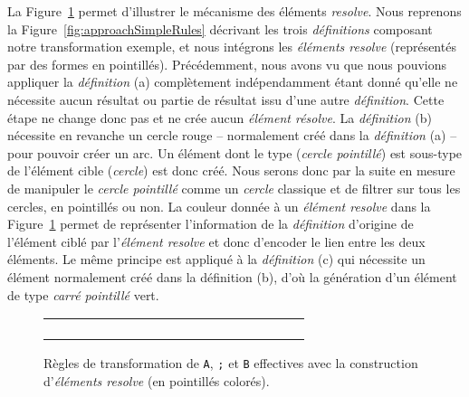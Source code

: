 
La Figure~\ref{fig:approachSimpleRulesResolve} permet d'illustrer le mécanisme
des éléments \emph{resolve}. Nous reprenons la
Figure~\ref{fig:approachSimpleRules} décrivant les trois \emph{définitions}
composant notre transformation exemple, et nous intégrons les \emph{éléments
resolve} (représentés par des formes en pointillés). Précédemment, nous avons
vu que nous pouvions appliquer la \emph{définition} (a) complètement
indépendamment étant donné qu'elle ne nécessite aucun résultat ou partie de
résultat issu d'une autre \emph{définition}. Cette étape ne change donc pas et
ne crée aucun \emph{élément résolve}. La \emph{définition} (b) nécessite en
revanche un cercle rouge -- normalement créé dans la \emph{définition} (a) --
pour pouvoir créer un arc. Un élément dont le type (\emph{cercle pointillé})
est sous-type de l'élément cible (\emph{cercle}) est donc créé. Nous serons
donc par la suite en mesure de manipuler le \emph{cercle pointillé} comme un
\emph{cercle} classique et de filtrer sur tous les cercles, en pointillés ou
non. La couleur donnée à un \emph{élément resolve} dans la
Figure~\ref{fig:approachSimpleRulesResolve} permet de représenter l'information
de la \emph{définition} d'origine de l'élément ciblé par l'\emph{élément
resolve} et donc d'encoder le lien entre les deux éléments. Le même principe
est appliqué à la \emph{définition} (c) qui nécessite un élément normalement
créé dans la définition (b), d'où la génération d'un élément de type
\emph{carré pointillé} vert.

\begin{figure}[h]
  \centering
\begin{tabular}{c|c|c}
  \begin{subfigure}{0.30\textwidth}
    \centering
    
    \subcaption{}
  \end{subfigure}
  &
  \begin{subfigure}{0.30\textwidth}
    \centering
    
    \subcaption{}
  \end{subfigure}
  &
  \begin{subfigure}{0.30\textwidth}
    \centering
    
    \subcaption{}
  \end{subfigure}
\end{tabular}
  \caption{Règles de transformation de \texttt{A}, \texttt{;} et \texttt{B}
effectives avec la construction d'\emph{éléments resolve} (en pointillés
colorés).}
  \label{fig:approachSimpleRulesResolve}
\end{figure}

